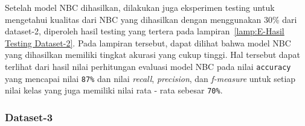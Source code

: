 Setelah model NBC dihasilkan, dilakukan juga eksperimen testing untuk mengetahui kualitas dari NBC yang dihasilkan dengan menggunakan 30\% dari dataset-2, diperoleh hasil testing yang tertera pada lampiran~\ref{lamp:E-Hasil Testing Dataset-2}. Pada lampiran tersebut, dapat dilihat bahwa model NBC yang dihasilkan memiliki tingkat akurasi yang cukup tinggi. Hal tersebut dapat terlihat dari hasil nilai perhitungan evaluasi model NBC pada nilai \texttt{accuracy} yang mencapai nilai \texttt{87\%} dan nilai \textit{recall}, \textit{precision}, dan \textit{f-measure} untuk setiap nilai kelas yang juga memiliki nilai rata - rata sebesar \texttt{70\%}.

\subsubsection{Dataset-3}
\label{subsubsec:Dataset-3}

